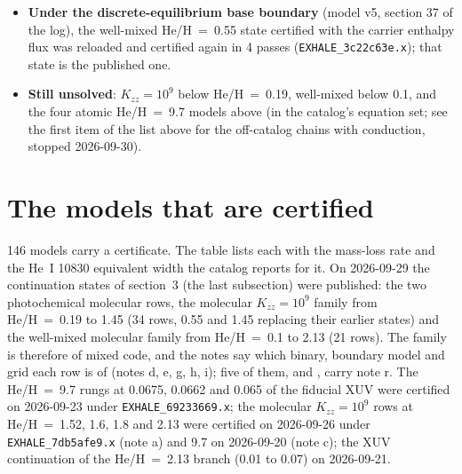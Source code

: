 \documentclass[11pt]{my_memo}
\newcommand{\case}[1]{\seqsplit{#1}}
\begin{document}
\begin{itemize}
      term changes the temperature of the H$_2$ layer by $-32$ to $+43$~K and
      the wind mass flux by $-0.2$ to $-0.9$ per cent.
\item \textbf{Under the discrete-equilibrium base boundary} (model v5,
      section 37 of the log), the well-mixed He/H~=~0.55 state certified
      with the carrier enthalpy flux was reloaded and certified again in 4
      passes (\texttt{EXHALE\_3c22c63e.x}); that state is the published one.
\item \textbf{Still unsolved}: $K_{zz}=10^{9}$ below He/H~=~0.19,
      well-mixed below 0.1, and the four atomic He/H~=~9.7 models above (in
      the catalog's equation set; see the first item of the list above for
      the off-catalog chains with conduction, stopped 2026-09-30).
\end{itemize}

\section{The models that are certified}

146 models carry a certificate. The table lists each with the mass-loss
rate and the He~I 10830 equivalent width the catalog reports for it. On
2026-09-29 the continuation states of section~3 (the last subsection) were
published: the two photochemical molecular rows, the molecular
$K_{zz}=10^{9}$ family from He/H~=~0.19 to 1.45 (34 rows, 0.55 and 1.45
replacing their earlier states) and the well-mixed molecular family from
He/H~=~0.1 to 2.13 (21 rows). The family is therefore of mixed code, and the
notes say which binary, boundary model and grid each row is of (notes d, e,
g, h, i); five of them, and \case{photochem\_kzzprofile/HeH2.09}, carry note
r. The He/H~=~9.7 rungs at 0.0675, 0.0662 and 0.065 of the fiducial XUV were
certified on 2026-09-23 under \texttt{EXHALE\_69233669.x}; the molecular
$K_{zz}=10^{9}$ rows at He/H~=~1.52, 1.6, 1.8 and 2.13 were certified on
2026-09-26 under \texttt{EXHALE\_7db5afe9.x} (note a) and 9.7 on 2026-09-20
(note c); the XUV continuation of the He/H~=~2.13 branch (0.01 to 0.07) on
2026-09-21.
\end{document}
